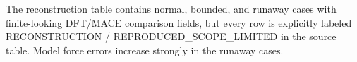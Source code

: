 The reconstruction table contains normal, bounded, and runaway cases with finite-looking DFT/MACE comparison fields, but every row is explicitly labeled RECONSTRUCTION / REPRODUCED\_SCOPE\_LIMITED in the source table. Model force errors increase strongly in the runaway cases.
